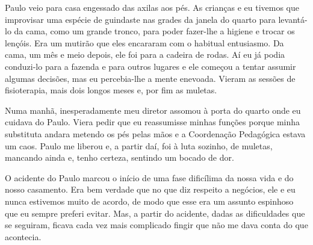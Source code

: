 Paulo veio para casa engessado das axilas aos pés.
As crianças e eu tivemos que improvisar uma espécie de guindaste nas grades da janela do quarto para levantá-lo da cama, como um grande tronco, para poder fazer-lhe a higiene e trocar os lençóis.
Era um mutirão que eles encararam com o habitual entusiasmo.
Da cama, um mês e meio depois, ele foi para a cadeira de rodas.
Aí eu já podia conduzi-lo para a fazenda e para outros lugares e ele começou a tentar assumir algumas decisões, mas eu percebia-lhe a mente enevoada.
Vieram as sessões de fisioterapia, mais dois longos meses e, por fim as muletas.

Numa manhã, inesperadamente meu diretor assomou à porta do quarto onde eu cuidava do Paulo.
Viera pedir que eu reassumisse minhas funções porque minha substituta andara metendo os pés pelas mãos e a Coordenação Pedagógica estava um caos.
Paulo me liberou e, a partir daí, foi à luta sozinho, de muletas, mancando ainda e, tenho certeza, sentindo um bocado de dor.

O acidente do Paulo marcou o início de uma fase dificílima da nossa vida e do nosso casamento.
Era bem verdade que no que diz respeito a negócios, ele e eu nunca estivemos muito de acordo, de modo que esse era um assunto espinhoso que eu sempre preferi evitar.
Mas, a partir do acidente, dadas as dificuldades que se seguiram, ficava cada vez mais complicado fingir que não me dava conta do que acontecia.

